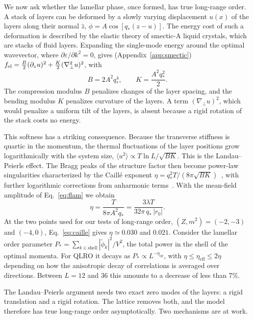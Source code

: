 \documentclass[aps,prd,twocolumn,superscriptaddress,nofootinbib,10pt]{revtex4-2}
\newcommand{\qs}{q_*}
\newcommand{\eff}{\mathrm{eff}}
\begin{document}
We now ask whether the lamellar phase, once formed, has true long-range
order.  A stack of layers can be deformed by a slowly varying displacement
$u(x)$ of the layers along their normal $\hat z$, $\phi=A\cos[\qs(z-u)]$.
The energy cost of such a deformation is described by the elastic theory of
smectic-A liquid crystals, which are stacks of fluid layers.  Expanding the
single-mode energy around the optimal wavevector, where
$\partial\varepsilon/\partial k^2=0$, gives (Appendix~\ref{app:smectic})
$f_{\rm el}=\frac B2(\partial_zu)^2+\frac K2(\nabla_\perp^2u)^2$, with
\begin{equation}
 B=2A^2\qs^4,\qquad K=\frac{A^2\qs^2}{2}.
 \label{eq:BK}
\end{equation}
The compression modulus $B$ penalizes changes of the layer spacing, and the
bending modulus $K$ penalizes curvature of the layers.  A term
$(\nabla_\perp u)^2$, which would penalize a uniform tilt of the layers, is
absent because a rigid rotation of the stack costs no energy.

This softness has a striking consequence.  Because the transverse stiffness is
quartic in the momentum, the thermal fluctuations of the layer positions grow
logarithmically with the system size,
$\langle u^2\rangle\propto T\ln L/\sqrt{BK}$.  This is the Landau--Peierls
effect.  The Bragg peaks of the structure factor then become power-law
singularities characterized by the Caill\'e exponent
$\eta=\qs^2T/(8\pi\sqrt{BK})$~\cite{Chaikin1995}, with further logarithmic
corrections from anharmonic terms~\cite{Grinstein1981,Grinstein1982}.  With
the mean-field amplitude of Eq.~\eqref{eq:flam} we obtain
\begin{equation}
 \eta=\frac{T}{8\pi A^2\qs}=\frac{3\lambda T}{32\pi\,\qs\,|r_0|}.
 \label{eq:caille}
\end{equation}
At the two points used for our tests of long-range order,
$(Z,m^2)=(-2,-3)$ and $(-4,0)$, Eq.~\eqref{eq:caille} gives $\eta\simeq0.030$
and $0.021$.  Consider the lamellar order parameter
$P_*=\sum_{k\in\text{shell}}|\tilde\phi_k|^2/V^2$, the total power in the
shell of the optimal momenta.  For QLRO it decays as $P_*\propto
L^{-\eta_\eff}$, with $\eta\le\eta_\eff\le2\eta$ depending on how the
anisotropic decay of correlations is averaged over directions.  Between $L=12$
and $36$ this amounts to a decrease of less than $7\%$.

The Landau--Peierls argument needs two exact zero modes of the layers: a
rigid translation and a rigid rotation.  The lattice removes both, and the
model therefore has true long-range order asymptotically.  Two mechanisms
are at work.
\end{document}
